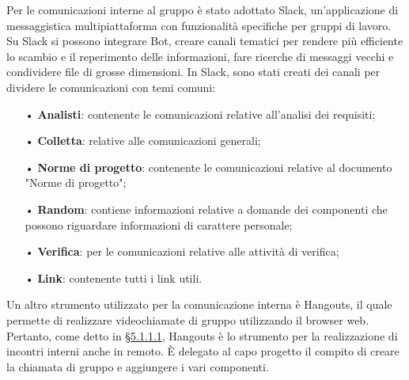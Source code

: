 Per le comunicazioni interne al gruppo è stato adottato {Slack}, un'applicazione di messaggistica multipiattaforma con funzionalità specifiche per gruppi di lavoro.  
\newline
Su Slack si possono integrare {Bot}, creare canali tematici per rendere più efficiente lo scambio e il reperimento delle informazioni, fare ricerche di messaggi vecchi e condividere file di grosse dimensioni.   
\newline
In Slack, sono stati creati dei canali per dividere le comunicazioni con temi comuni:
\begin{itemize}
\item[•] \textbf{Analisti}: contenente le comunicazioni relative all'analisi dei requisiti;
\item[•] \textbf{Colletta}: relative alle comunicazioni generali;
\item[•] \textbf{Norme di progetto}: contenente le comunicazioni relative al documento "Norme di progetto";
\item[•] \textbf{Random}: contiene informazioni relative a domande dei componenti che possono riguardare informazioni di carattere personale;
\item[•] \textbf{Verifica}: per le comunicazioni relative alle attività di verifica;
\item[•] \textbf{Link}: contenente tutti i link utili.
\end{itemize}
Un altro strumento utilizzato per la comunicazione interna è Hangouts, il quale permette di realizzare videochiamate di gruppo utilizzando il browser web. Pertanto, come detto in \hyperref[sec:interni]{§5.1.1.1}, Hangouts è lo strumento per la realizzazione di incontri interni anche in remoto. \uppercase{è} delegato al capo progetto il compito di creare la chiamata di gruppo e aggiungere i vari componenti.
